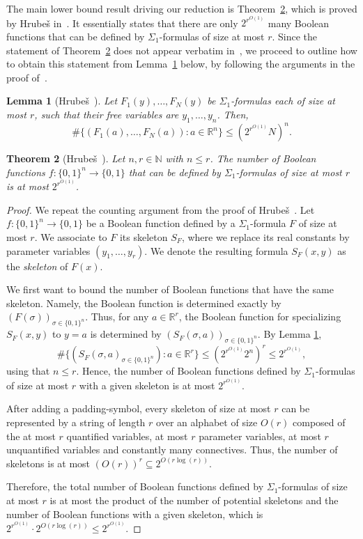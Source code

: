 \documentclass[centering,11pt,reqno]{amsart}
\newtheorem{theorem}{Theorem}[section]
\newtheorem{lem}[theorem]{Lemma}
\theoremstyle{definition}
\newcommand{\R}{\mathbb{R}}
\def\R{\mathbb{R}}
\newcommand{\defn}[1]{\emph{#1}}
\begin{document}
The main lower bound result driving our reduction is Theorem~\ref{Hrubes}, which is proved by Hrube\v{s} in~\cite[Theorem~2.2]{Hru20}. 
It essentially states that there are only $2^{r^{O(1)}}$ many Boolean functions that can be defined by $\Sigma_1$-formulas of size at most $r$.
Since the statement of Theorem~\ref{Hrubes} does not appear verbatim in~\cite{Hru20}, we proceed to outline how to obtain this statement from Lemma~\ref{Hrubes-lemma} below, by following the arguments in the proof of~\cite[Theorem~2.2]{Hru20}. 

\begin{lem}[Hrube\v{s}~{\cite[Lemma~5.1]{Hru20}}]\label{Hrubes-lemma}
    Let $F_1(y),\dots,F_N(y)$ be $\Sigma_1$-formulas each of size at most $r$, such that their free variables are $y_1,\dots,y_n$.
    Then, 
    \[\#\{(F_1(a),\dots,F_N(a)):a\in\R^n\}\le\left(2^{r^{O(1)}}N\right)^n.\]
\end{lem}

\begin{theorem}[Hrube\v{s}~{\cite[proof of Theorem~2.2]{Hru20}}]\label{Hrubes}
    Let $n,r\in\mathbb{N}$ with $n\le r$.
    The number of Boolean functions $f:\{0,1\}^n\to\{0,1\}$ that can be defined by $\Sigma_1$-formulas of size at most $r$ is at most $2^{r^{O(1)}}$.
\end{theorem}
\begin{proof}
    We repeat the counting argument from the proof of Hrube\v{s}~\cite[Theorem~2.2]{Hru20}. Let $f: \{0,1\}^{n} \to \{0,1\}$ be a Boolean function defined by a $\Sigma_{1}$-formula $F$ of size at most $r$. We associate to $F$ its skeleton $S_{F}$, where we replace its real constants by parameter variables $(y_1,\dots,y_r)$. We denote the resulting formula $S_F(x,y)$ as the \defn{skeleton} of $F(x)$. 

    
    
    
     We first want to bound the number of Boolean functions that have the same skeleton. Namely, the Boolean function is determined exactly by $(F(\sigma))_{\sigma \in \{0,1\}^{n}}$. Thus, for any $a \in \mathbb{R}^{r}$, the Boolean function for specializing $S_{F}(x,y)$ to $y = a$ is determined by $(S_{F}(\sigma, a))_{\sigma \in \{0,1\}^{n}}$. By Lemma \ref{Hrubes-lemma},
    \[\#\{(S_{F}(\sigma,a)_{\sigma\in\{0,1\}^n}):a\in\R^r\}\le(2^{r^{O(1)}}2^n)^r\le2^{r^{O(1)}},\]
    using that $n\le r$. Hence, the number of Boolean functions defined by $\Sigma_{1}$-formulas of size at most $r$ with a given skeleton is at most $2^{r^{O(1)}}$.

    After adding a padding-symbol, every skeleton of size at most $r$ can be represented by a string of length $r$ over an alphabet of size $O(r)$ composed of the at most $r$ quantified variables, at most $r$ parameter variables, at most $r$ unquantified variables and constantly many connectives. Thus, the number of skeletons is at most $(O(r))^{r} \subseteq 2^{O(r \log(r))}$.
    
    Therefore, the total number of Boolean functions defined by $\Sigma_{1}$-formulas of size at most $r$ is at most the product of the number of potential skeletons and the number of Boolean functions with a given skeleton, which is  $2^{r^{O(1)}}\cdot2^{O(r\log(r))}\le2^{r^{O(1)}}$.
\end{proof}
\end{document}
